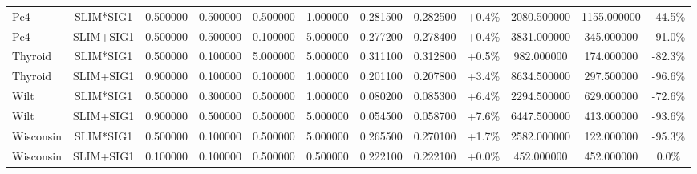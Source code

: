 \begin{table}[H]
\begin{tabular}{lccccccccccc}
Pc4 & SLIM*SIG1 & 0.500000 & 0.500000 & 0.500000 & 1.000000 & 0.281500 & 0.282500 & +0.4\% & 2080.500000 & 1155.000000 & -44.5\% \\
Pc4 & SLIM+SIG1 & 0.500000 & 0.500000 & 0.100000 & 5.000000 & 0.277200 & 0.278400 & +0.4\% & 3831.000000 & 345.000000 & -91.0\% \\
Thyroid & SLIM*SIG1 & 0.500000 & 0.100000 & 5.000000 & 5.000000 & 0.311100 & 0.312800 & +0.5\% & 982.000000 & 174.000000 & -82.3\% \\
Thyroid & SLIM+SIG1 & 0.900000 & 0.100000 & 0.100000 & 1.000000 & 0.201100 & 0.207800 & +3.4\% & 8634.500000 & 297.500000 & -96.6\% \\
Wilt & SLIM*SIG1 & 0.500000 & 0.300000 & 0.500000 & 1.000000 & 0.080200 & 0.085300 & +6.4\% & 2294.500000 & 629.000000 & -72.6\% \\
Wilt & SLIM+SIG1 & 0.900000 & 0.500000 & 0.500000 & 5.000000 & 0.054500 & 0.058700 & +7.6\% & 6447.500000 & 413.000000 & -93.6\% \\
Wisconsin & SLIM*SIG1 & 0.500000 & 0.100000 & 0.500000 & 5.000000 & 0.265500 & 0.270100 & +1.7\% & 2582.000000 & 122.000000 & -95.3\% \\
Wisconsin & SLIM+SIG1 & 0.100000 & 0.100000 & 0.500000 & 0.500000 & 0.222100 & 0.222100 & +0.0\% & 452.000000 & 452.000000 & 0.0\% \\
\bottomrule
\end{tabular}
\end{table}
    